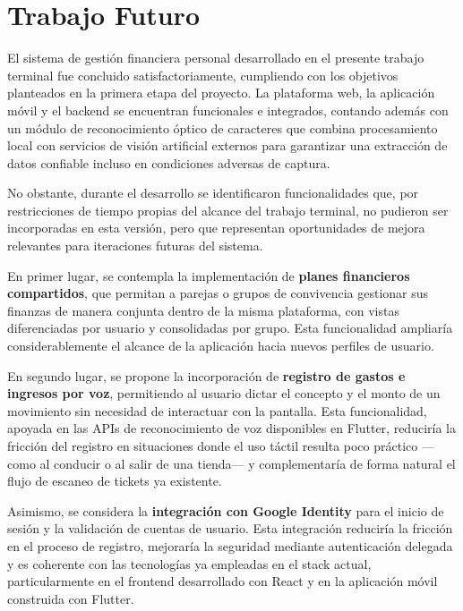 \chapter{Trabajo Futuro}
El sistema de gestión financiera personal desarrollado en el presente trabajo terminal fue concluido satisfactoriamente, cumpliendo con los objetivos planteados en la primera etapa del proyecto. La plataforma web, la aplicación móvil y el backend se encuentran funcionales e integrados, contando además con un módulo de reconocimiento óptico de caracteres que combina procesamiento local con servicios de visión artificial externos para garantizar una extracción de datos confiable incluso en condiciones adversas de captura.

\bigskip

No obstante, durante el desarrollo se identificaron funcionalidades que, por restricciones de tiempo propias del alcance del trabajo terminal, no pudieron ser incorporadas en esta versión, pero que representan oportunidades de mejora relevantes para iteraciones futuras del sistema.

\bigskip

En primer lugar, se contempla la implementación de \textbf{planes financieros compartidos}, que permitan a parejas o grupos de convivencia gestionar sus finanzas de manera conjunta dentro de la misma plataforma, con vistas diferenciadas por usuario y consolidadas por grupo. Esta funcionalidad ampliaría considerablemente el alcance de la aplicación hacia nuevos perfiles de usuario.

\bigskip

En segundo lugar, se propone la incorporación de \textbf{registro de gastos e ingresos por voz}, permitiendo al usuario dictar el concepto y el monto de un movimiento sin necesidad de interactuar con la pantalla. Esta funcionalidad, apoyada en las APIs de reconocimiento de voz disponibles en Flutter, reduciría la fricción del registro en situaciones donde el uso táctil resulta poco práctico —como al conducir o al salir de una tienda— y complementaría de forma natural el flujo de escaneo de tickets ya existente.

\bigskip

Asimismo, se considera la \textbf{integración con Google Identity} para el inicio de sesión y la validación de cuentas de usuario. Esta integración reduciría la fricción en el proceso de registro, mejoraría la seguridad mediante autenticación delegada y es coherente con las tecnologías ya empleadas en el stack actual, particularmente en el frontend desarrollado con React y en la aplicación móvil construida con Flutter.

